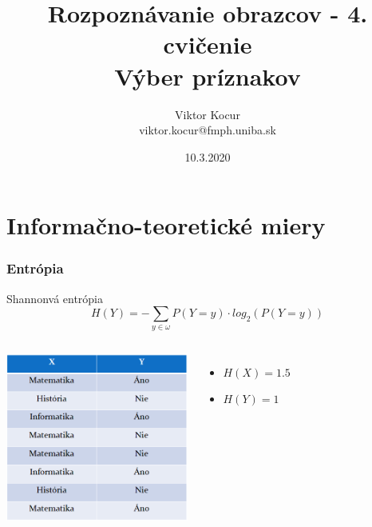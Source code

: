\documentclass{beamer}
\title[Výber príznakov]{Rozpoznávanie obrazcov - 4. cvičenie \\ Výber príznakov}
\author[Viktor Kocur]{Viktor Kocur \\{\small viktor.kocur@fmph.uniba.sk}}
\institute{DAI FMFI UK}
\date{10.3.2020}
\begin{document}

\begin{frame}[plain]
  \titlepage  
\end{frame}

\section{Informačno-teoretické miery}

\begin{frame}
\frametitle{Entrópia}
  \centering
  Shannonvá entrópia
  \begin{equation*}
  H(Y) = - \sum_{y \in \omega} P(Y = y) \cdot log_2(P(Y = y)) 
  \end{equation*}
  

\begin{columns}[onlytextwidth,T]


  \column{27mm}
  \includegraphics[width=60mm]{tabulka.png}
  
  \column{\dimexpr\linewidth-60mm-6mm}

  \begin{itemize}
  \item<2-> $H(X) = 1.5$
  \item<3-> $H(Y) = 1$
  \end{itemize}
\end{columns}
\end{frame}
\end{document}
